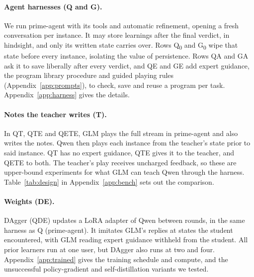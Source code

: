 \paragraph{Agent harnesses (Q and G).}
We run prime-agent \citep{karten2026primeagent} with its tools and automatic refinement, opening a fresh conversation per instance. It may store learnings after the final verdict, in hindsight, and only its written state carries over. Rows Q\textsubscript{0} and G\textsubscript{0} wipe that state before every instance, isolating the value of persistence. Rows QA and GA ask it to save liberally after every verdict, and QE and GE add expert guidance, the program library procedure and guided playing rules (Appendix~\ref{app:prompts}), to check, save and reuse a program per task. Appendix~\ref{app:harness} gives the details.

\paragraph{Notes the teacher writes (T).}
In QT, QTE and QETE, GLM plays the full stream in prime-agent and also writes the notes. Qwen then plays each instance from the teacher's state prior to said instance. QT has no expert guidance, QTE gives it to the teacher, and QETE to both. The teacher's play receives uncharged feedback, so these are upper-bound experiments for what GLM can teach Qwen through the harness. Table~\ref{tab:design} in Appendix~\ref{app:bench} sets out the comparison.

\paragraph{Weights (DE).}
DAgger \citep{ross2011dagger} (QDE) updates a LoRA adapter \citep{hu2022lora} of Qwen between rounds, in the same harness as Q (prime-agent). It imitates GLM's replies at states the student encountered, with GLM reading expert guidance withheld from the student. All prior learners run at one user, but DAgger also runs at two and four. Appendix~\ref{app:trained} gives the training schedule and compute, and the unsuccessful policy-gradient and self-distillation variants we tested.

